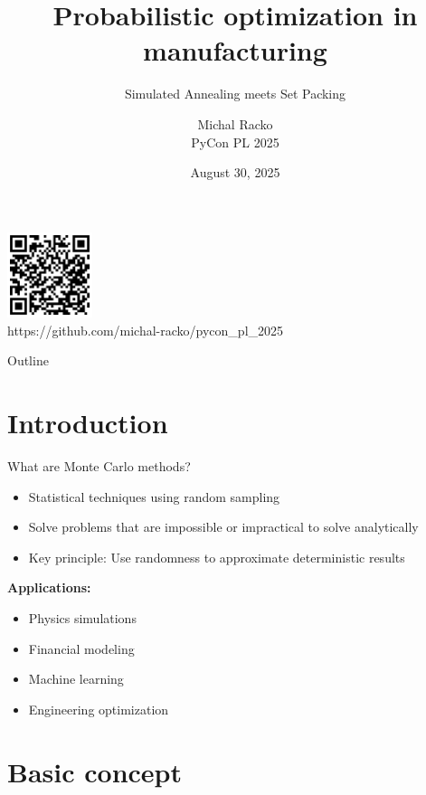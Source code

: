 \documentclass{beamer}
\title{Probabilistic optimization in manufacturing}
\subtitle{Simulated Annealing meets Set Packing}
\author{Michal Racko \\ PyCon PL 2025}
\date{August 30, 2025}
\begin{document}
\begin{frame}
  \titlepage
  \vspace{-0.5cm}
  \begin{center}
    \includegraphics[width=2.5cm]{images/github.png}
    \\[0.2cm]
    \small{https://github.com/michal-racko/pycon\_pl\_2025}
  \end{center}
\end{frame}

\begin{frame}{Outline}
  \tableofcontents
\end{frame}

\section{Introduction}

\begin{frame}{What are Monte Carlo methods?}
  \begin{itemize}
    \item Statistical techniques using random sampling
    \item Solve problems that are impossible or impractical to solve analytically
    \item Key principle: Use randomness to approximate deterministic results
  \end{itemize}
  
  \vspace{0.5cm}
  \textbf{Applications:}
  \begin{itemize}
    \item Physics simulations
    \item Financial modeling
    \item Machine learning
    \item Engineering optimization
  \end{itemize}
\end{frame}

\section{Basic concept}
\end{document}

